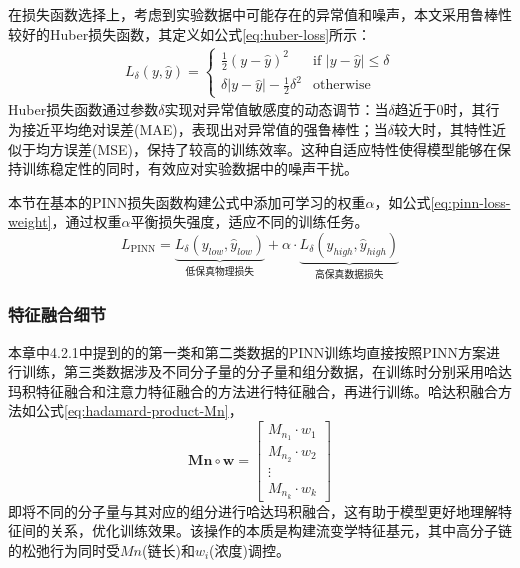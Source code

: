 在损失函数选择上，考虑到实验数据中可能存在的异常值和噪声，本文采用鲁棒性较好的Huber损失函数，其定义如公式\eqref{eq:huber-loss}所示：
\begin{equation}
  \begin{aligned}
    L_\delta(y, \hat{y}) =
    \begin{cases}
      \frac{1}{2}(y - \hat{y})^2                 & \text{if } |y - \hat{y}| \le \delta    \\
      \delta |y - \hat{y}| - \frac{1}{2}\delta^2 & \text{otherwise} \label{eq:huber-loss}
    \end{cases}
  \end{aligned}
\end{equation}
Huber损失函数通过参数$\delta$实现对异常值敏感度的动态调节：当$\delta$趋近于0时，其行为接近平均绝对误差(MAE)，表现出对异常值的强鲁棒性；当$\delta$较大时，其特性近似于均方误差(MSE)，保持了较高的训练效率。这种自适应特性使得模型能够在保持训练稳定性的同时，有效应对实验数据中的噪声干扰。

本节在基本的PINN损失函数构建公式中添加可学习的权重$\alpha$，如公式\eqref{eq:pinn-loss-weight}，通过权重$\alpha$平衡损失强度，适应不同的训练任务。
\begin{equation}
  L_{\text{PINN}} = \underbrace{L_\delta(y_{low}, \hat{y}_{low})}_{\text{低保真物理损失}} + \alpha \cdot \underbrace{L_\delta(y_{high}, \hat{y}_{high})}_{\text{高保真数据损失}}  \label{eq:pinn-loss-weight}
\end{equation}

\subsubsection{特征融合细节}
本章中4.2.1中提到的的第一类和第二类数据的PINN训练均直接按照PINN方案进行训练，第三类数据涉及不同分子量的分子量和组分数据，在训练时分别采用哈达玛积特征融合和注意力特征融合的方法进行特征融合，再进行训练。哈达积融合方法如公式\eqref{eq:hadamard-product-Mn}，
\begin{equation}
  \mathbf{Mn} \circ \mathbf{w} =
  \begin{bmatrix}
    M_{n_1} \cdot w_1 \\
    M_{n_2} \cdot w_2 \\
    \vdots            \\
    M_{n_k} \cdot w_k
  \end{bmatrix} \label{eq:hadamard-product-Mn}
\end{equation}
即将不同的分子量与其对应的组分进行哈达玛积融合，这有助于模型更好地理解特征间的关系，优化训练效果。该操作的本质是构建流变学特征基元，其中高分子链的松弛行为同时受$Mn$(链长)和$w_i$(浓度)调控。

